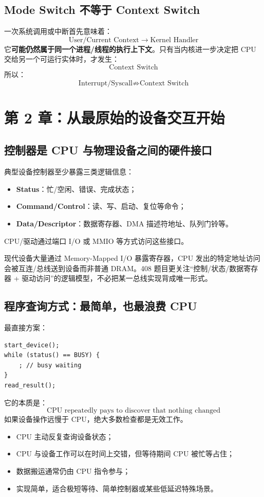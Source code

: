 \documentclass[11pt,a4paper]{ctexart}
\newcommand{\kw}[1]{\textbf{#1}}
\newcommand{\arr}{\;\longrightarrow\;}
\begin{document}
\subsection{Mode Switch 不等于 Context Switch}
一次系统调用或中断首先意味着：
\[
\text{User/Current Context}\arr\text{Kernel Handler}
\]
它\kw{可能仍然属于同一个进程/线程的执行上下文}。只有当内核进一步决定把 CPU 交给另一个可运行实体时，才发生：
\[
\boxed{\text{Context Switch}}
\]
所以：
\[
\boxed{\text{Interrupt/Syscall} \not\Rightarrow \text{Context Switch}}
\]

\section{第 2 章：从最原始的设备交互开始}

\subsection{控制器是 CPU 与物理设备之间的硬件接口}
典型设备控制器至少暴露三类逻辑信息：
\begin{itemize}
  \item \kw{Status}：忙/空闲、错误、完成状态；
  \item \kw{Command/Control}：读、写、启动、复位等命令；
  \item \kw{Data/Descriptor}：数据寄存器、DMA 描述符地址、队列门铃等。
\end{itemize}
CPU/驱动通过端口 I/O 或 MMIO 等方式访问这些接口。

\begin{eng}
现代设备大量通过 Memory-Mapped I/O 暴露寄存器，CPU 发出的特定地址访问会被互连/总线送到设备而非普通 DRAM。408 题目更关注“控制/状态/数据寄存器 + 驱动访问”的逻辑模型，不必把某一总线实现背成唯一形式。
\end{eng}

\subsection{程序查询方式：最简单，也最浪费 CPU}
最直接方案：
\begin{lstlisting}
start_device();
while (status() == BUSY) {
    ; // busy waiting
}
read_result();
\end{lstlisting}

它的本质是：
\[
\boxed{\text{CPU repeatedly pays to discover that nothing changed}}
\]
如果设备操作远慢于 CPU，绝大多数检查都是无效工作。

\begin{exam}
\begin{itemize}
  \item CPU 主动反复查询设备状态；
  \item CPU 与设备工作可以在时间上交错，但等待期间 CPU 被忙等占住；
  \item 数据搬运通常仍由 CPU 指令参与；
  \item 实现简单，适合极短等待、简单控制器或某些低延迟特殊场景。
\end{itemize}
\end{exam}
\end{document}
